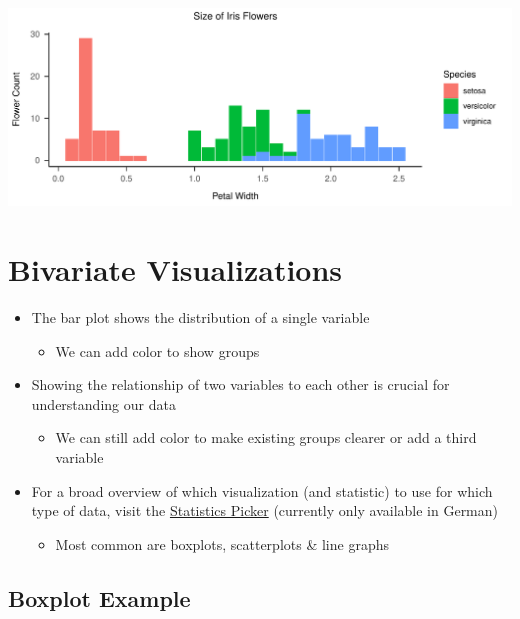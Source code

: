 \documentclass[
]{book}
\providecommand{\tightlist}{%
  \setlength{\itemsep}{0pt}\setlength{\parskip}{0pt}}
\begin{document}
\begin{flushleft}\includegraphics{_main_files/figure-latex/unnamed-chunk-54-1} \end{flushleft}

\section{Bivariate Visualizations}\label{bivariate-visualizations}

\begin{itemize}
\tightlist
\item
  The bar plot shows the distribution of a single variable

  \begin{itemize}
  \tightlist
  \item
    We can add color to show groups
  \end{itemize}
\item
  Showing the relationship of two variables to each other is crucial for understanding our data

  \begin{itemize}
  \tightlist
  \item
    We can still add color to make existing groups clearer or add a third variable
  \end{itemize}
\item
  For a broad overview of which visualization (and statistic) to use for which type of data, visit the \href{https://the-tave.shinyapps.io/Statistics-Picker/}{Statistics Picker} (currently only available in German)

  \begin{itemize}
  \tightlist
  \item
    Most common are boxplots, scatterplots \& line graphs
  \end{itemize}
\end{itemize}

\subsection{Boxplot Example}\label{boxplot-example}
\end{document}
